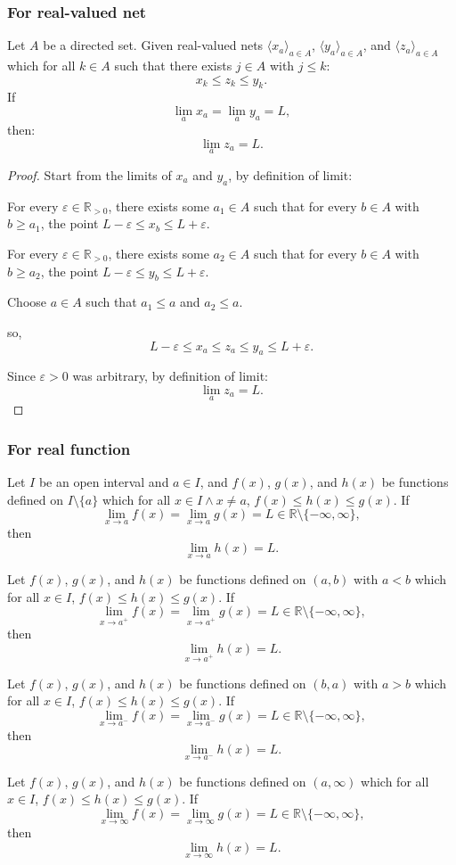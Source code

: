 \subsubsection{For real-valued net}
Let $A$ be a directed set. Given real-valued nets $\langle x_a\rangle_{a\in A}$, $\langle y_a\rangle_{a\in A}$, and $\langle z_a\rangle_{a\in A}$ which for all $k\in A$ such that there exists $j\in A$ with $j\leq k$:
\[x_k\leq z_k\leq y_k.\]
If
\[\lim_{a}x_a=\lim_{a}y_a=L,\]
then: 
\[\lim_{a}z_a=L.\]
\begin{proof}
Start from the limits of $x_a$ and $y_a$, by definition of limit:

For every $\varepsilon\in\mathbb{R}_{>0}$, there exists some $a_1\in A$ such that for every $b\in A$ with $b\geq a_1$, the point $L-\varepsilon\leq x_b\leq L+\varepsilon$.

For every $\varepsilon\in\mathbb{R}_{>0}$, there exists some $a_2\in A$ such that for every $b\in A$ with $b\geq a_2$, the point $L-\varepsilon\leq y_b\leq L+\varepsilon$.

Choose $a\in A$ such that $a_1\leq a$ and $a_2\leq a$.

so,
\[L-\varepsilon\leq x_{a}\leq z_{a}\leq y_{a}\leq L+\varepsilon.\]

Since $\varepsilon > 0$ was arbitrary, by definition of limit:
\[\lim_{a}z_a=L.\]
\end{proof}
\subsubsection{For real function}
Let $I$ be an open interval and $a\in I$, and $f(x)$, $g(x)$, and $h(x)$ be functions defined on $I\setminus\{a\}$ which for all $x\in I\land x\neq a$, $f(x)\leq h(x)\leq g(x)$. If
\[\lim_{x\to a}f(x)=\lim_{x\to a}g(x)=L\in\mathbb{R}\setminus\{-\infty,\infty\},\]
then
\[\lim_{x\to a}h(x)=L.\]

Let $f(x)$, $g(x)$, and $h(x)$ be functions defined on $(a,b)$ with $a<b$ which for all $x\in I$, $f(x)\leq h(x)\leq g(x)$. If
\[\lim_{x\to a^+}f(x)=\lim_{x\to a^+}g(x)=L\in\mathbb{R}\setminus\{-\infty,\infty\},\]
then
\[\lim_{x\to a^+}h(x)=L.\]

Let $f(x)$, $g(x)$, and $h(x)$ be functions defined on $(b,a)$ with $a>b$ which for all $x\in I$, $f(x)\leq h(x)\leq g(x)$. If
\[\lim_{x\to a^-}f(x)=\lim_{x\to a^-}g(x)=L\in\mathbb{R}\setminus\{-\infty,\infty\},\]
then
\[\lim_{x\to a^-}h(x)=L.\]

Let $f(x)$, $g(x)$, and $h(x)$ be functions defined on $(a,\infty)$ which for all $x\in I$, $f(x)\leq h(x)\leq g(x)$. If
\[\lim_{x\to\infty}f(x)=\lim_{x\to\infty}g(x)=L\in\mathbb{R}\setminus\{-\infty,\infty\},\]
then
\[\lim_{x\to\infty}h(x)=L.\]

